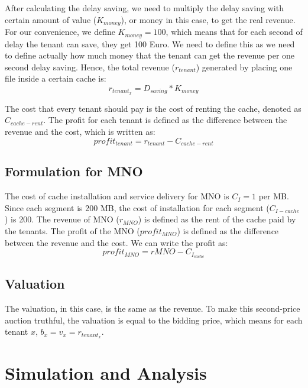 \documentclass[conference]{IEEEtran}
\begin{document}
After calculating the delay saving, we need to multiply the delay saving with certain amount of value ($K_{money}$), or money in this case, to get the real revenue. For our convenience, we define $K_{money} = 100$, which means that for each second of delay the tenant can save, they get 100 Euro. We need to define this as we need to define actually how much money that the tenant can get the revenue per one second delay saving. Hence, the total revenue ($r_{tenant}$) generated by placing one file inside a certain cache is:
\begin{equation}
r_{tenant_x} = D_{saving} * K_{money} \label{eq}
\end{equation}

The cost that every tenant should pay is the cost of renting the cache, denoted as $C_{cache-rent}$. The profit for each tenant is defined as the difference between the revenue and the cost, which is written as:
\begin{equation}
	profit_{tenant} = r_{tenant} - C_{cache-rent} \label{eq}
\end{equation}

\subsection{Formulation for MNO}
The cost of cache installation and service delivery for MNO is $C_I = 1$ per MB. Since each segment is 200 MB, the cost of installation for each segment ($C_{I-cache}$) is 200. The revenue of MNO ($r_{MNO}$) is defined as the rent of the cache paid by the tenants. The profit of the MNO ($profit_{MNO}$) is defined as the difference between the revenue and the cost. We can write the profit as:
\begin{equation}
	profit_{MNO} = r{MNO} - C_{I_{cache}} \label{eq}
\end{equation}     

\subsection{Valuation}
The valuation, in this case, is the same as the revenue. To make this second-price auction truthful, the valuation is equal to the bidding price, which means for each tenant $x$, $b_x = v_x = r_{tenant_x}$. 

\section{Simulation and Analysis}\label{sec:simul-analysis}
\end{document}
